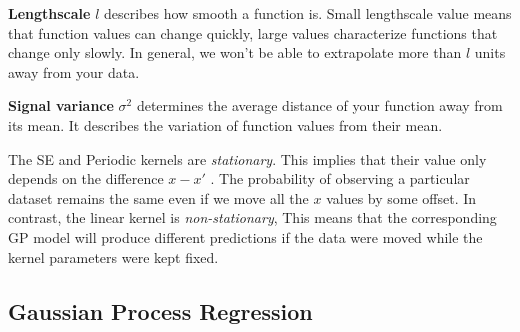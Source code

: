 \documentclass[12pt]{report}
\begin{document}
\textbf{Lengthscale} $l$ describes how smooth a function is. Small lengthscale value means that function values can change quickly, large values characterize functions that change only slowly. In general, we won't be able to extrapolate more than $l$ units away from your data.

\textbf{Signal variance} $\sigma^2$ determines the average distance of your function away from its mean. It describes the variation of function values from their mean.
\cite{rasmussen2003gaussian}

The SE and Periodic kernels are \textit{stationary}. This implies that their value only depends on the difference $x - x'$ . The probability of observing a particular dataset remains the same even if we move all the $x$ values by some offset. In contrast, the linear kernel is \textit{non-stationary}, This means that the corresponding GP model will produce different predictions if the data were moved while the kernel parameters were kept fixed.

\subsection{Gaussian Process Regression}
\label{GPR}

\end{document}
